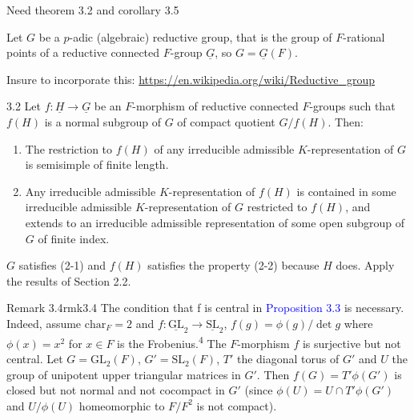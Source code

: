 \documentclass{article}
\let\temp\phi
\let\phi\varphi
\let\varphi\temp
\begin{document}
Need theorem 3.2 and corollary 3.5

Let $G$ be a $p$-adic (algebraic) reductive group, that is
the group of $F$-rational points of a reductive connected $F$-group $\underline{G}$, so $G=
\underline{G}(F)$.

Insure to incorporate this: \url{https://en.wikipedia.org/wiki/Reductive_group}




\begin{thm}{}{3.2}
  Let \(f: \underline{H} \to \underline{G}\) be an \(F\)-morphism of reductive connected \(F\)-groups such
  that \(f(H)\) is a normal subgroup of \(G\) of compact quotient \(G/f(H)\). Then:

  \begin{enumerate}
    \item  The restriction to \(f(H)\) of any irreducible admissible \(K\)-representation of \(G\) is semisimple of finite length.
    \item Any irreducible admissible \(K\)-representation of \(f(H)\) is contained in some irreducible
      admissible \(K\)-representation of \(G\) restricted to \(f(H)\), and extends to an irreducible
      admissible representation of some open subgroup of \(G\) of finite index.
  \end{enumerate}
\end{thm}

\begin{Proof}
  \(G\) satisfies (2-1) and \(f(H)\) satisfies the property (2-2) because \(H\) does. Apply the results of Section 2.2.
\end{Proof}

\begin{titledBox}{Remark 3.4}{rmk3.4}
The condition that f is central in \textcolor{blue}{Proposition 3.3} is necessary. Indeed, assume \(\mathrm{char}_F = 2\) and \(f: \underline{\mathrm{GL}}_2 \to \underline{\mathrm{SL}}_2\), \(f(g) = \varphi(g) / \det g\) where \(\varphi(x) = x^2\) for \(x \in F\) is the Frobenius.\textsuperscript{4} The \(F\)-morphism \(f\) is surjective but not central. Let \(G = \mathrm{GL}_2(F)\), \(G' = \mathrm{SL}_2(F)\), \(T'\) the diagonal torus of \(G'\) and \(U\) the group of unipotent upper triangular matrices in \(G'\). Then \(f(G) = T'\varphi(G')\) is closed but not normal and not cocompact in \(G'\) (since \(\varphi(U) = U \cap T'\varphi(G')\) and \(U/\varphi(U)\) homeomorphic to \(F/F^2\) is not compact).
\end{titledBox}
\end{document}
